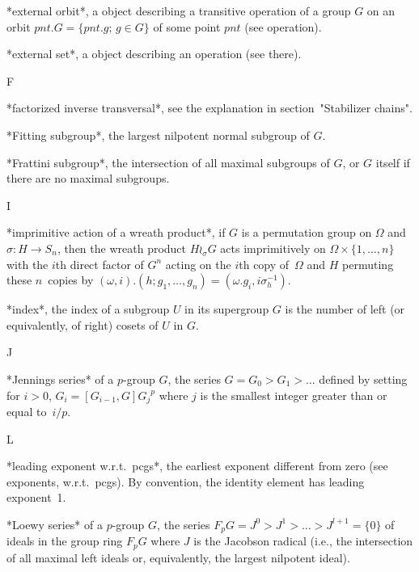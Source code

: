*external orbit*, a {\GAP} object  describing a transitive operation of a
group $G$ on an orbit  $pnt.G = \{pnt.g;\,g\in  G\}$ of some point  $pnt$
(see operation).

*external set*, a {\GAP} object describing an operation (see there).

 F

*factorized   inverse     transversal*,    see     the   explanation   in
section~"Stabilizer chains".

*Fitting subgroup*, the largest nilpotent normal subgroup of $G$.

*Frattini subgroup*, the intersection of all maximal subgroups of $G$, or
$G$ itself if there are no maximal subgroups.

 I

*imprimitive action  of a wreath product*,  if $G$ is a permutation group
on   $\Omega$   and $\sigma\colon H\to  S_n$,   then  the  wreath product
$H\wr_\sigma G$ acts imprimitively on $\Omega \times \{1,\ldots,n\}$ with
the $i$th direct factor of $G^n$ acting on the $i$th copy of~$\Omega$ and
$H$   permuting   these  $n$~copies  by  $(\omega,i).(h;g_1,\ldots,g_n) =
(\omega.g_i,i\sigma_h^{-1})$.

*index*, the index of a subgroup $U$ in  its supergroup $G$ is the number
of left (or equivalently, of right) cosets of $U$ in $G$.

 J

*Jennings series* of a $p$-group $G$, the series $G = G_0 > G_1 > \ldots$
defined by setting for $i>0$, $G_i = [ G_{i-1}, G ] {G_j}^p$ where $j$ is
the smallest integer greater than or equal to~$i / p$.

 L

*leading exponent w.r.t.~pcgs*, the earliest exponent different from zero
(see exponents, w.r.t.~pcgs). By   convention, the identity   element has
leading exponent~1.

*Loewy series* of a $p$-group $G$, the series $F_pG = J^0  > J^1 > \ldots
> J^{l+1}  = \{0\}$ of ideals  in the group ring $F_pG$  where $J$ is the
Jacobson radical (i.e.,  the intersection of all  maximal left ideals or,
equivalently, the largest nilpotent ideal).

